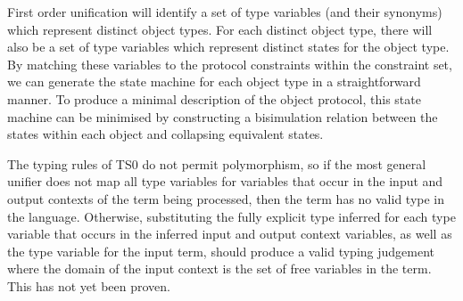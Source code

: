 \documentclass[preprint]{sigplanconf}
\begin{document}
First order unification will identify a set of type variables (and their synonyms)
which represent distinct object types. For each distinct object type, there
will also be a set of type variables which represent distinct states for
the object type. By matching these variables to the protocol constraints
within the constraint set, we can generate the state machine for each
object type in a straightforward manner. To produce a minimal description of 
the object protocol, this state machine can be minimised by constructing a 
bisimulation relation between the states within each object and collapsing 
equivalent states.

The typing rules of TS0 do not permit polymorphism, so
if the most general unifier does not map all type variables for
variables that occur in the input and output contexts of the term being
processed, then the term has no valid type in the language. Otherwise,
substituting the fully explicit type inferred for each type variable that
occurs in the inferred input and output context variables, as well as the
type variable for the input term, should produce a valid typing judgement
where the domain of the input context is the set of free variables in
the term. This has not yet been proven.
\end{document}
